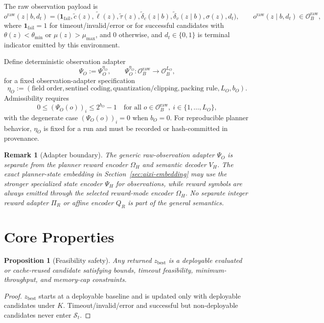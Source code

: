 \documentclass[11pt]{article}
\newtheorem{proposition}{Proposition}
\newtheorem{remark}{Remark}
\begin{document}
The raw observation payload is
\[
o^{\mathrm{raw}}(z\mid b,d_t)=
\Big(
\mathbf{1}_{\mathrm{fail}},
\tilde c(z),
\tilde \ell(z),
\tilde \tau(z),
\tilde\delta_c(z\mid b),
\tilde\delta_v(z\mid b),
\sigma(z),
d_t
\Big),
\qquad
o^{\mathrm{raw}}(z\mid b,d_t)\in\mathcal{O}^{\mathrm{raw}}_B,
\]
where $\mathbf{1}_{\mathrm{fail}}=1$ for timeout/invalid/error or for successful candidates with
$\theta(z)<\theta_{\min}$ or $\mu(z)>\mu_{\max}$, and $0$ otherwise,
and $d_t\in\{0,1\}$ is terminal indicator emitted by this environment.

Define deterministic observation adapter
\[
\Psi_O:=\Psi_O^{\eta_O},
\qquad
\Psi_O^{\eta_O}:\mathcal{O}^{\mathrm{raw}}_B\to\mathcal{O}_B^{L_O},
\]
for a fixed observation-adapter specification
\[
\eta_O:=(\text{field order},\text{sentinel coding},\text{quantization/clipping},
\text{packing rule},L_O,b_O).
\]
Admissibility requires
\[
0\le (\Psi_O(o))_i\le 2^{b_O}-1
\quad\text{for all }o\in\mathcal{O}^{\mathrm{raw}}_B,\ i\in\{1,\dots,L_O\},
\]
with the degenerate case $(\Psi_O(o))_i=0$ when $b_O=0$.
For reproducible planner behavior, $\eta_O$ is fixed for a run and must be
recorded or hash-committed in provenance.

\begin{remark}[Adapter boundary]
The generic raw-observation adapter $\Psi_O$ is separate from the planner
reward encoder $\Omega_H$ and semantic decoder $V_H$. The exact planner-state
embedding in Section~\ref{sec:aixi-embedding} may use the stronger specialized
state encoder $\Psi_H$ for observations, while reward symbols are always
emitted through the selected reward-mode encoder $\Omega_H$. No separate
integer reward adapter $\Pi_R$ or affine encoder $Q_R$ is part of the general
semantics.
\end{remark}

\section{Core Properties}

\begin{proposition}[Feasibility safety]
Any returned $z_{\mathrm{best}}$ is a deployable evaluated or cache-reused candidate satisfying
bounds, timeout feasibility, minimum-throughput, and memory-cap constraints.
\end{proposition}

\begin{proof}
$z_{\mathrm{best}}$ starts at a deployable baseline and is updated only with
deployable candidates under $K$. Timeout/invalid/error and successful but
non-deployable candidates never enter $\mathcal{S}_t$.
\end{proof}
\end{document}
